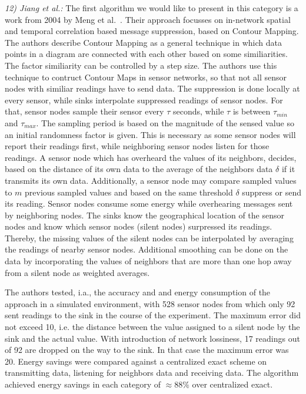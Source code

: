 \textit{12) Jiang et al.:}
The first algorithm we would like to present in this category is a work from
2004 by Meng et al.~\cite{meng2004event}. Their approach focusses on in-network
spatial and temporal correlation based message suppression, based on Contour
Mapping. The authors describe Contour Mapping as a general technique in which
data points in a diagram are connected with each other based on some
similiarities. The factor similiarity can be controlled by a step size. The
authors use this technique to contruct Contour Maps in sensor networks, so that
not all sensor nodes with similiar readings have to send data. The suppression
is done locally at every sensor, while sinks interpolate suppressed
readings of sensor nodes. For that, sensor nodes sample their sensor every $
\tau $ seconds, while $ \tau $ is between $ \tau_{min} $ and $ \tau_{max} $.
The sampling period is based on the magnitude of the sensed value so an initial
randomness factor is given. This is necessary as some sensor nodes will report
their readings first, while neighboring sensor nodes listen for those readings.
A sensor node which has overheard the values of its neighbors, decides, based
on the distance of its own data to the average of the neighbors data $ \delta $
if it transmits its own data. Additionally, a sensor node may compare sampled
values to $ m $ previous sampled values and based on the same threshold $
\delta $ suppress or send its reading. Sensor nodes consume some energy while
overhearing messages sent by neighboring nodes. The sinks know the
geographical location of the sensor nodes and know which sensor nodes (silent
nodes) surpressed its readings. Thereby, the missing values of the silent nodes
can be interpolated by averaging the readings of nearby sensor nodes.
Additional smoothing can be done on the data by incorporating the values of
neighbors that are more than one hop away from a silent node as weighted
averages.

The authors tested, i.a., the accuracy and and energy consumption of the
approach in a simulated environment, with 528 sensor nodes from which only 92 sent
readings to the sink in the course of the experiment. The maximum error did not
exceed 10, i.e. the distance between the value assigned to a silent node by the
sink and the actual value. With introduction of network lossiness, 17 readings
out of 92 are dropped on the way to the sink. In that case the maximum error
was 20. Energy savings were compared against a centralized exact scheme on
transmitting data, listening for neighbors data and receiving data. The
algorithm achieved energy savings in each category of $ \approx88\% $ over
centralized exact.

